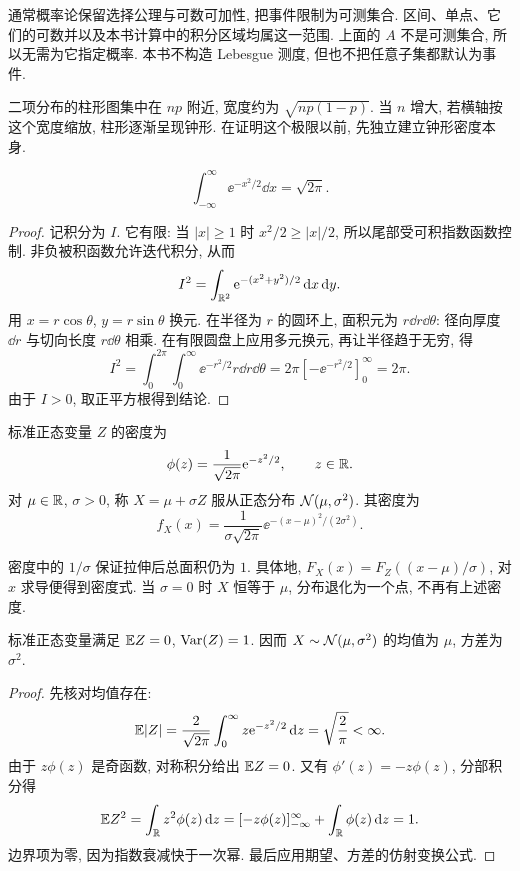 通常概率论保留选择公理与可数可加性, 把事件限制为可测集合. 区间、单点、它们的可数并以及本书计算中的积分区域均属这一范围. 上面的 $A$ 不是可测集合, 所以无需为它指定概率. 本书不构造 Lebesgue 测度, 但也不把任意子集都默认为事件.


二项分布的柱形图集中在 $np$ 附近, 宽度约为 $\sqrt{np(1-p)}$. 当 $n$ 增大, 若横轴按这个宽度缩放, 柱形逐渐呈现钟形. 在证明这个极限以前, 先独立建立钟形密度本身.

\begin{lemma}[高斯积分]
\[
 \int_{-\infty}^{\infty}\ee^{-x^2/2}\dd x=\sqrt{2\pi}.
\]
\end{lemma}
\begin{proof}
记积分为 $I$. 它有限: 当 $|x|\ge1$ 时 $x^2/2\ge|x|/2$, 所以尾部受可积指数函数控制. 非负被积函数允许迭代积分, 从而
\[
 I^2=\int_{\mathbb R^2}\mathrm e^{-(x^2+y^2)/2}\,\mathrm d x\,\mathrm d y.
\]
用 $x=r\cos\theta$, $y=r\sin\theta$ 换元. 在半径为 $r$ 的圆环上, 面积元为 $r\dd r\dd\theta$: 径向厚度 $\dd r$ 与切向长度 $r\dd\theta$ 相乘. 在有限圆盘上应用多元换元, 再让半径趋于无穷, 得
\[
 I^2=\int_0^{2\pi}\int_0^\infty
       \ee^{-r^2/2}r\dd r\dd\theta
 =2\pi[-\ee^{-r^2/2}]_0^\infty=2\pi.
\]
由于 $I>0$, 取正平方根得到结论.
\end{proof}

\begin{definition}[正态分布]
标准正态变量 $Z$ 的密度为
\[
 \phi(z)=\frac1{\sqrt{2\pi}}\mathrm e^{-z^2/2},\qquad z\in\mathbb R.
\]
对 $\mu\in\mathbb R$, $\sigma>0$, 称 $X=\mu+\sigma Z$ 服从正态分布 $\mathcal N(\mu,\sigma^2)$. 其密度为
\[
 f_X(x)=\frac1{\sigma\sqrt{2\pi}}
       \ee^{-(x-\mu)^2/(2\sigma^2)}.
\]
\end{definition}

密度中的 $1/\sigma$ 保证拉伸后总面积仍为 $1$. 具体地,
$F_X(x)=F_Z((x-\mu)/\sigma)$, 对 $x$ 求导便得到密度式. 当 $\sigma=0$ 时 $X$ 恒等于 $\mu$, 分布退化为一个点, 不再有上述密度.

\begin{proposition}
标准正态变量满足 $\mathbb E Z=0$, $\operatorname{Var}(Z)=1$. 因而 $X\sim\mathcal N(\mu,\sigma^2)$ 的均值为 $\mu$, 方差为 $\sigma^2$.
\end{proposition}
\begin{proof}
先核对均值存在:
\[
 \mathbb E|Z|=\frac2{\sqrt{2\pi}}\int_0^\infty
 z\mathrm e^{-z^2/2}\,\mathrm d z=\sqrt{\frac2\pi}<\infty.
\]
由于 $z\phi(z)$ 是奇函数, 对称积分给出 $\mathbb E Z=0$. 又有 $\phi'(z)=-z\phi(z)$, 分部积分得
\[
 \mathbb E Z^2=\int_{\mathbb R}z^2\phi(z)\,\mathrm d z
 =[-z\phi(z)]_{-\infty}^{\infty}+\int_{\mathbb R}\phi(z)\,\mathrm d z=1.
\]
边界项为零, 因为指数衰减快于一次幂. 最后应用期望、方差的仿射变换公式.
\end{proof}

